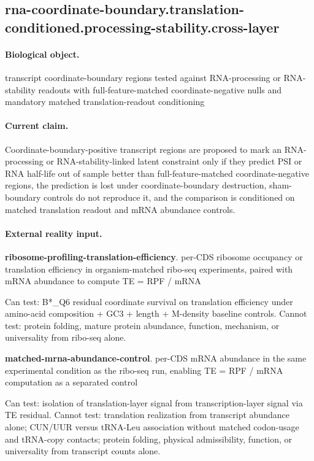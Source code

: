 \subsection{rna-coordinate-boundary.translation-conditioned.processing-stability.cross-layer}

\paragraph{Biological object.} transcript coordinate-boundary regions tested against RNA-processing or RNA-stability readouts with full-feature-matched coordinate-negative nulls and mandatory matched translation-readout conditioning

\paragraph{Current claim.} Coordinate-boundary-positive transcript regions are proposed to mark an RNA-processing or RNA-stability-linked latent constraint only if they predict PSI or RNA half-life out of sample better than full-feature-matched coordinate-negative regions, the prediction is lost under coordinate-boundary destruction, sham-boundary controls do not reproduce it, and the comparison is conditioned on matched translation readout and mRNA abundance controls.

\paragraph{External reality input.}
\textbf{ribosome-profiling-translation-efficiency}. per-CDS ribosome occupancy or translation efficiency in organism-matched ribo-seq experiments, paired with mRNA abundance to compute TE = RPF / mRNA

Can test: B*\_Q6 residual coordinate survival on translation efficiency under amino-acid composition + GC3 + length + M-density baseline controls. Cannot test: protein folding, mature protein abundance, function, mechanism, or universality from ribo-seq alone.

\textbf{matched-mrna-abundance-control}. per-CDS mRNA abundance in the same experimental condition as the ribo-seq run, enabling TE = RPF / mRNA computation as a separated control

Can test: isolation of translation-layer signal from transcription-layer signal via TE residual. Cannot test: translation realization from transcript abundance alone; CUN/UUR versus tRNA-Leu association without matched codon-usage and tRNA-copy contacts; protein folding, physical admissibility, function, or universality from transcript counts alone.

